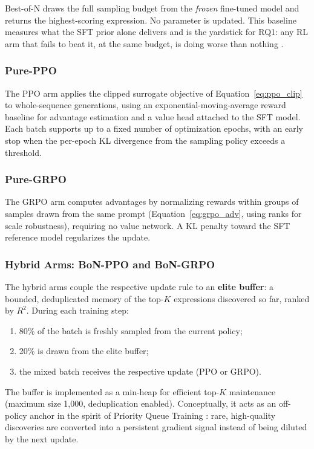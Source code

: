 Best-of-N draws the full sampling budget from the \emph{frozen} fine-tuned model and returns the highest-scoring expression. No parameter is updated. This baseline measures what the SFT prior alone delivers and is the yardstick for RQ1: any RL arm that fails to beat it, at the same budget, is doing worse than nothing \cite{stiennon2020learning}.

\subsubsection{Pure-PPO}

The PPO arm applies the clipped surrogate objective of Equation~\ref{eq:ppo_clip} to whole-sequence generations, using an exponential-moving-average reward baseline for advantage estimation and a value head attached to the SFT model. Each batch supports up to a fixed number of optimization epochs, with an early stop when the per-epoch KL divergence from the sampling policy exceeds a threshold.

\subsubsection{Pure-GRPO}

The GRPO arm computes advantages by normalizing rewards within groups of samples drawn from the same prompt (Equation~\ref{eq:grpo_adv}, using ranks for scale robustness), requiring no value network. A KL penalty toward the SFT reference model regularizes the update.

\subsubsection{Hybrid Arms: BoN-PPO and BoN-GRPO}

The hybrid arms couple the respective update rule to an \textbf{elite buffer}: a bounded, deduplicated memory of the top-$K$ expressions discovered so far, ranked by $R^2$. During each training step:
\begin{enumerate}
    \item 80\% of the batch is freshly sampled from the current policy;
    \item 20\% is drawn from the elite buffer;
    \item the mixed batch receives the respective update (PPO or GRPO).
\end{enumerate}
The buffer is implemented as a min-heap for efficient top-$K$ maintenance (maximum size 1{,}000, deduplication enabled). Conceptually, it acts as an off-policy anchor in the spirit of Priority Queue Training \cite{petersen2020deep}: rare, high-quality discoveries are converted into a persistent gradient signal instead of being diluted by the next update.

